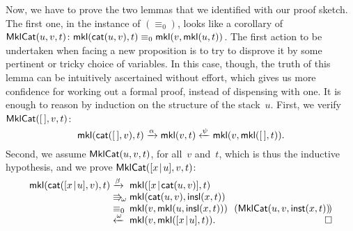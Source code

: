 Now, we have to prove the two lemmas that we identified with our proof
sketch. The first one, in the instance of \((\equiv_0)\), looks like a
corollary of \(\textsf{MklCat}({u,v,t})
\colon \textsf{mkl}(\textsf{cat}(u,v),t) \equiv_0
\textsf{mkl}(v,\textsf{mkl}(u,t))\). The first action to be undertaken when
facing a new proposition is to try to disprove it by some pertinent or
tricky choice of variables. In this case, though, the truth of this
lemma can be intuitively ascertained without effort, which gives us
more confidence for working out a formal proof, instead of dispensing
with one. It is enough to reason by induction on the structure of the
stack~\(u\). First, we verify \(\textsf{MklCat}({[\,],v,t})\):
\begin{equation*}
\textsf{mkl}(\textsf{cat}([\,],v),t)
  \xrightarrow{\smash{\alpha}} \textsf{mkl}(v,t)
  \xleftarrow{\smash{\psi}} \textsf{mkl}(v,\textsf{mkl}([\,],t)).
\end{equation*}
Second, we assume \(\textsf{MklCat}({u,v,t})\), for all~\(v\) and~\(t\),
which is thus the inductive hypothesis, and we prove
\(\textsf{MklCat}({[{x}\!\mid\!{u}],v,t})\):
\begin{equation*}
  \begin{array}{@{}r@{\;}l@{\;}l@{\quad}r@{}}
      \fun{mkl}(\fun{cat}(\cons{x}{u},v),t)
& \xrightarrow{\smash{\beta}} &
  \fun{mkl}(\cons{x}{\fun{cat}(u,v)},t)\\
& \Rra{\omega} &
  \fun{mkl}(\fun{cat}(u,v),\fun{insl}(x,t))\\
& \equiv_0 & \fun{mkl}(v,\fun{mkl}(u,\fun{insl}(x,t)))
         & \!\!(\pred{MklCat}{u,v,\fun{inst}(x,t)}\!)\\
& \xleftarrow{\smash{\omega}} &
  \fun{mkl}(v,\fun{mkl}(\cons{x}{u},t)). & \hfill\Box
\end{array}
\end{equation*}


